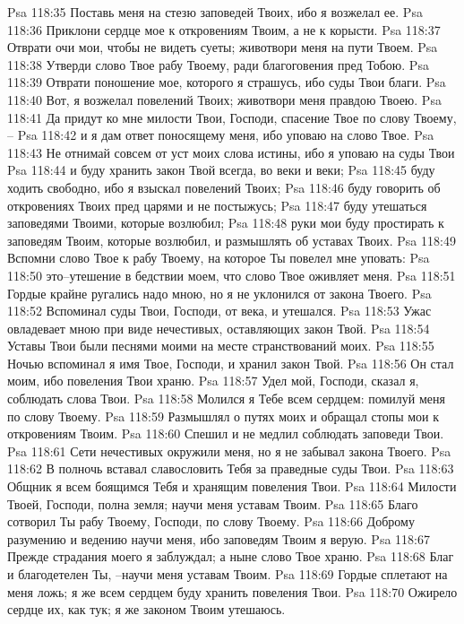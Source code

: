 Psa 118:35  Поставь меня на стезю заповедей Твоих, ибо я возжелал ее.
Psa 118:36  Приклони сердце мое к откровениям Твоим, а не к корысти.
Psa 118:37  Отврати очи мои, чтобы не видеть суеты; животвори меня на пути Твоем.
Psa 118:38  Утверди слово Твое рабу Твоему, ради благоговения пред Тобою.
Psa 118:39  Отврати поношение мое, которого я страшусь, ибо суды Твои благи.
Psa 118:40  Вот, я возжелал повелений Твоих; животвори меня правдою Твоею.
Psa 118:41  Да придут ко мне милости Твои, Господи, спасение Твое по слову Твоему, --
Psa 118:42  и я дам ответ поносящему меня, ибо уповаю на слово Твое.
Psa 118:43  Не отнимай совсем от уст моих слова истины, ибо я уповаю на суды Твои
Psa 118:44  и буду хранить закон Твой всегда, во веки и веки;
Psa 118:45  буду ходить свободно, ибо я взыскал повелений Твоих;
Psa 118:46  буду говорить об откровениях Твоих пред царями и не постыжусь;
Psa 118:47  буду утешаться заповедями Твоими, которые возлюбил;
Psa 118:48  руки мои буду простирать к заповедям Твоим, которые возлюбил, и размышлять об уставах Твоих.
Psa 118:49  Вспомни слово Твое к рабу Твоему, на которое Ты повелел мне уповать:
Psa 118:50  это--утешение в бедствии моем, что слово Твое оживляет меня.
Psa 118:51  Гордые крайне ругались надо мною, но я не уклонился от закона Твоего.
Psa 118:52  Вспоминал суды Твои, Господи, от века, и утешался.
Psa 118:53  Ужас овладевает мною при виде нечестивых, оставляющих закон Твой.
Psa 118:54  Уставы Твои были песнями моими на месте странствований моих.
Psa 118:55  Ночью вспоминал я имя Твое, Господи, и хранил закон Твой.
Psa 118:56  Он стал моим, ибо повеления Твои храню.
Psa 118:57  Удел мой, Господи, сказал я, соблюдать слова Твои.
Psa 118:58  Молился я Тебе всем сердцем: помилуй меня по слову Твоему.
Psa 118:59  Размышлял о путях моих и обращал стопы мои к откровениям Твоим.
Psa 118:60  Спешил и не медлил соблюдать заповеди Твои.
Psa 118:61  Сети нечестивых окружили меня, но я не забывал закона Твоего.
Psa 118:62  В полночь вставал славословить Тебя за праведные суды Твои.
Psa 118:63  Общник я всем боящимся Тебя и хранящим повеления Твои.
Psa 118:64  Милости Твоей, Господи, полна земля; научи меня уставам Твоим.
Psa 118:65  Благо сотворил Ты рабу Твоему, Господи, по слову Твоему.
Psa 118:66  Доброму разумению и ведению научи меня, ибо заповедям Твоим я верую.
Psa 118:67  Прежде страдания моего я заблуждал; а ныне слово Твое храню.
Psa 118:68  Благ и благодетелен Ты, --научи меня уставам Твоим.
Psa 118:69  Гордые сплетают на меня ложь; я же всем сердцем буду хранить повеления Твои.
Psa 118:70  Ожирело сердце их, как тук; я же законом Твоим утешаюсь.
